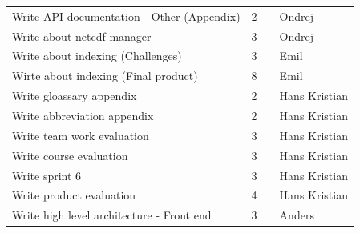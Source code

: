 \documentclass[11pt,a4paper,titlepage,oneside]{report}
\begin{document}
\begin{table}[h]
{\begin{tabular}{llll}
Write \gls{API}-documentation - Other (Appendix)             & 2                                                                   &                                                         & Ondrej                     \\
Write about \gls{netcdf} manager                             & 3                                                                   &                                                         & Ondrej                     \\
Write about indexing (Challenges)                      & 3                                                                   &                                                         & Emil                       \\
Wirte about indexing (Final product)                   & 8                                                                   &                                                         & Emil                       \\
Write gloassary appendix                               & 2                                                                   &                                                         & Hans Kristian              \\
Write abbreviation appendix                            & 2                                                                   &                                                         & Hans Kristian              \\
Write team work evaluation                             & 3                                                                   &                                                         & Hans Kristian              \\
Write course evaluation                                & 3                                                                   &                                                         & Hans Kristian              \\
Write sprint 6                                         & 3                                                                   &                                                         & Hans Kristian              \\
Write product evaluation                               & 4                                                                   &                                                         & Hans Kristian              \\
Write high level architecture - Front end              & 3                                                                   &                                                         & Anders                     \\

\end{tabular}}
\end{table}
\end{document}
